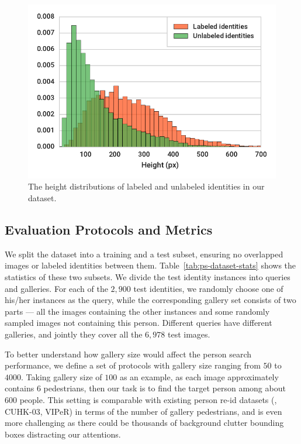 \begin{figure}[t]
\begin{center}
\includegraphics[width=1.0\linewidth]{figures/person_search/height-distr.pdf}
\end{center}
\caption{The height distributions of labeled and unlabeled identities in our dataset.}
\label{fig:ps-height-distr}
\end{figure}

\subsection{Evaluation Protocols and Metrics} %
\label{sub:ps-evaluation-protocols-and-metrics}
We split the dataset into a training and a test subset, ensuring no overlapped images or labeled identities between them. Table~\ref{tab:ps-dataset-stats} shows the statistics of these two subsets. We divide the test identity instances into queries and galleries. For each of the $2,900$ test identities, we randomly choose one of his/her instances as the query, while the corresponding gallery set consists of two parts --- all the images containing the other instances and some randomly sampled images not containing this person. Different queries have different galleries, and jointly they cover all the $6,978$ test images.

To better understand how gallery size would affect the person search performance, we define a set of protocols with gallery size ranging from $50$ to $4000$. Taking gallery size of $100$ as an example, as each image approximately contains $6$ pedestrians, then our task is to find the target person among about $600$ people. This setting is comparable with existing person re-id datasets (\eg, CUHK-03, VIPeR) in terms of the number of gallery pedestrians, and is even more challenging as there could be thousands of background clutter bounding boxes distracting our attentions.

